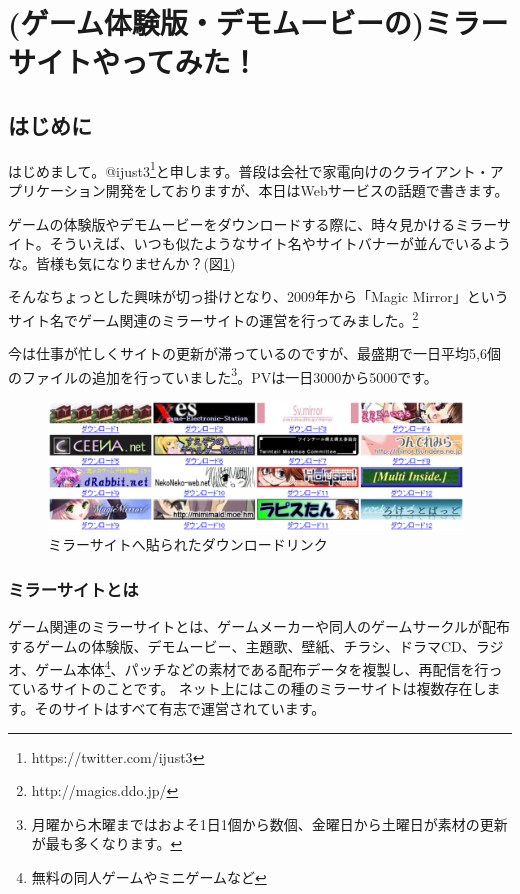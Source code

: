 \section{(ゲーム体験版・デモムービーの)ミラーサイトやってみた！}

\subsection{はじめに}
はじめまして。@ijust3\footnote{https://twitter.com/ijust3}と申します。普段は会社で家電向けのクライアント・アプリケーション開発をしておりますが、本日はWebサービスの話題で書きます。

ゲームの体験版やデモムービーをダウンロードする際に、時々見かけるミラーサイト。そういえば、いつも似たようなサイト名やサイトバナーが並んでいるような。皆様も気になりませんか？(図\ref{fig:mirrors})

そんなちょっとした興味が切っ掛けとなり、2009年から「Magic Mirror」というサイト名でゲーム関連のミラーサイトの運営を行ってみました。\footnote{http://magics.ddo.jp/}

今は仕事が忙しくサイトの更新が滞っているのですが、最盛期で一日平均5,6個のファイルの追加を行っていました\footnote{月曜から木曜まではおよそ1日1個から数個、金曜日から土曜日が素材の更新が最も多くなります。}。PVは一日3000から5000です。

\begin{figure}[hbp]
 \begin{center}
  \includegraphics[width=110mm]{ijust3-mirror/img/mirrors.eps}
 \end{center}
 \caption{ミラーサイトへ貼られたダウンロードリンク}
 \label{fig:mirrors}
\end{figure}

\subsubsection{ミラーサイトとは}

ゲーム関連のミラーサイトとは、ゲームメーカーや同人のゲームサークルが配布するゲームの体験版、デモムービー、主題歌、壁紙、チラシ、ドラマCD、ラジオ、ゲーム本体\footnote{無料の同人ゲームやミニゲームなど}、パッチなどの素材である配布データを複製し、再配信を行っているサイトのことです。%
ネット上にはこの種のミラーサイトは複数存在します。そのサイトはすべて有志で運営されています。

